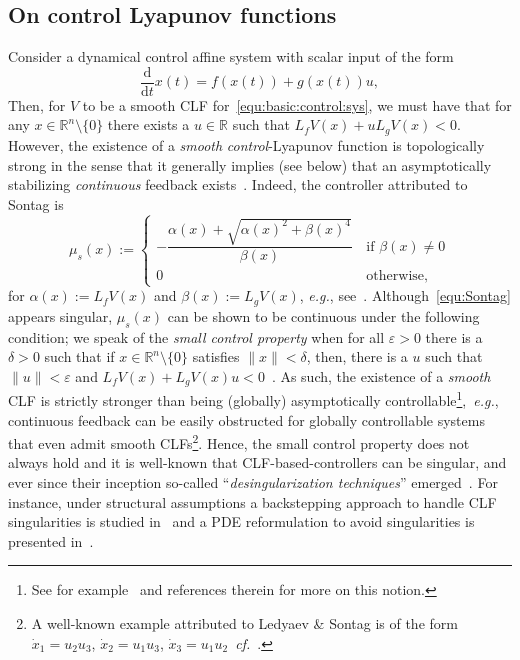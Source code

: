 \documentclass[letterpaper, 10 pt, conference]{ieeeconf}  %
\theoremstyle{mystyle}
\begin{document}
\subsection{On control Lyapunov functions}
Consider a dynamical control affine system with scalar input of the form
\begin{equation}
\label{equ:basic:control:sys}
    \frac{\mathrm{d}}{\mathrm{d}t}x(t) = f(x(t))+g(x(t))u,
\end{equation}
Then, for $V$ to be a smooth CLF for~\eqref{equ:basic:control:sys}, we must have that for any $x\in \mathbb{R}^n\setminus\{0\}$ there exists a $u\in \mathbb{R}$ such that $L_f V(x) + u L_g V(x) < 0$. However, the existence of a \textit{smooth} \textit{control}-Lyapunov function is topologically strong in the sense that it generally implies (see below) that an asymptotically stabilizing \textit{continuous} feedback exists~\cite[Ch.~5]{ref:sontag2013mathematical}. Indeed, the controller attributed to Sontag is 
\begin{equation}
    \label{equ:Sontag}
    \mu_s(x) := \begin{cases}
  - \dfrac{\alpha(x)+\sqrt{\alpha(x)^2+\beta(x)^4}}{\beta(x)} \, & \text{if } \beta(x)\neq 0\\
  0 \, & \text{otherwise}, 
    \end{cases}
\end{equation}
for $\alpha(x):=L_f V(x)$ and $\beta(x):=L_gV(x)$,
\textit{e.g.}, see~\cite[p.~249]{ref:sontag2013mathematical}. Although~\eqref{equ:Sontag} appears singular, $\mu_s(x)$ can be shown to be continuous under the following condition; we speak of the \textit{{small control property}} when for all $\varepsilon>0$ there is a $\delta>0$ such that if $x\in \mathbb{R}^n\setminus \{0\}$ satisfies $\|x\|<\delta$, then, there is a $u$ such that $\|u\|<\varepsilon$ and $L_fV(x)+L_gV(x) u<0$~\cite[p.~247]{ref:sontag1989universal}. As such, the existence of a \textit{smooth} CLF is strictly stronger than being (globally) asymptotically controllable\footnote{See for example~\cite[Sec.~2]{ref:rifford2002semiconcave} and references therein for more on this notion.},~\textit{e.g.}, continuous feedback can be easily obstructed for globally controllable systems that even admit smooth CLFs\footnote{A well-known example attributed to Ledyaev \& Sontag is of the form $\dot{x}_1=u_2u_3$, $\dot{x}_2=u_1u_3$, $\dot{x}_3=u_1u_2$~\textit{cf.}~\cite{ref:ledyaev1999lyapunov}.}. Hence, the small control property does not always hold and it is well-known that CLF-based-controllers can be singular, and ever since their inception so-called ``\textit{desingularization techniques}'' emerged~\cite[Sec.~12.5.1]{ref:coron2007control}. For instance, under structural assumptions a backstepping approach to handle CLF singularities is studied in~\cite{ref:li1997maximizing} and a PDE reformulation to avoid singularities is presented in~\cite{ref:yamashita2000global}.
\end{document}
